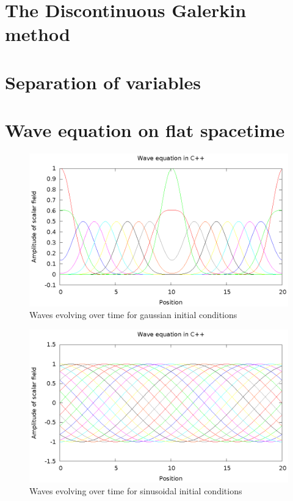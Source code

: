 \section{The Discontinuous Galerkin method}
\section{Separation of variables}
\section{Wave equation on flat spacetime}

\begin{figure}
  \includegraphics{gaussWave}
  \caption{Waves evolving over time for gaussian initial conditions}
\end{figure}

\begin{figure}
  \includegraphics{sineWave}
  \caption{Waves evolving over time for sinusoidal initial conditions}
\end{figure}

